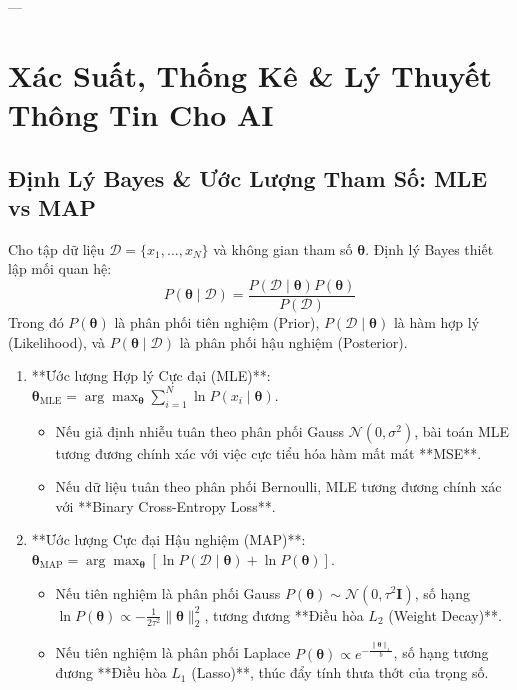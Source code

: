 ---

\section{Xác Suất, Thống Kê \& Lý Thuyết Thông Tin Cho AI}
\label{sec:probability-information-theory}

\subsection{Định Lý Bayes \& Ước Lượng Tham Số: MLE vs MAP}
Cho tập dữ liệu $\mathcal{D} = \{x_1, \dots, x_N\}$ và không gian tham số $\boldsymbol{\theta}$. Định lý Bayes thiết lập mối quan hệ:
\begin{equation}
P(\boldsymbol{\theta} \mid \mathcal{D}) = \frac{P(\mathcal{D} \mid \boldsymbol{\theta}) P(\boldsymbol{\theta})}{P(\mathcal{D})}
\end{equation}
Trong đó $P(\boldsymbol{\theta})$ là phân phối tiên nghiệm (Prior), $P(\mathcal{D} \mid \boldsymbol{\theta})$ là hàm hợp lý (Likelihood), và $P(\boldsymbol{\theta} \mid \mathcal{D})$ là phân phối hậu nghiệm (Posterior).

\begin{theorem}
\begin{enumerate}
  \item **Ước lượng Hợp lý Cực đại (MLE)**: $\boldsymbol{\theta}_{\text{MLE}} = \arg\max_{\boldsymbol{\theta}} \sum_{i=1}^N \ln P(x_i \mid \boldsymbol{\theta})$.
  \begin{itemize}
    \item Nếu giả định nhiễu tuân theo phân phối Gauss $\mathcal{N}(0, \sigma^2)$, bài toán MLE tương đương chính xác với việc cực tiểu hóa hàm mất mát **MSE**.
    \item Nếu dữ liệu tuân theo phân phối Bernoulli, MLE tương đương chính xác với **Binary Cross-Entropy Loss**.
  \end{itemize}
  \item **Ước lượng Cực đại Hậu nghiệm (MAP)**: $\boldsymbol{\theta}_{\text{MAP}} = \arg\max_{\boldsymbol{\theta}} [\ln P(\mathcal{D} \mid \boldsymbol{\theta}) + \ln P(\boldsymbol{\theta})]$.
  \begin{itemize}
    \item Nếu tiên nghiệm là phân phối Gauss $P(\boldsymbol{\theta}) \sim \mathcal{N}(0, \tau^2 \mathbf{I})$, số hạng $\ln P(\boldsymbol{\theta}) \propto -\frac{1}{2\tau^2}\|\boldsymbol{\theta}\|_2^2$, tương đương **Điều hòa $L_2$ (Weight Decay)**.
    \item Nếu tiên nghiệm là phân phối Laplace $P(\boldsymbol{\theta}) \propto e^{-\frac{\|\boldsymbol{\theta}\|_1}{b}}$, số hạng tương đương **Điều hòa $L_1$ (Lasso)**, thúc đẩy tính thưa thớt của trọng số.
  \end{itemize}
\end{enumerate}
\end{theorem}

